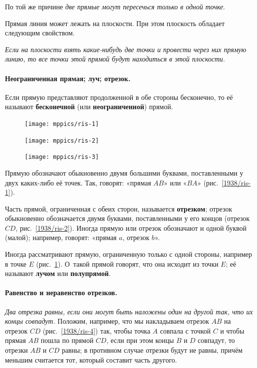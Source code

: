 \documentclass[twoside]{book}
\makeatletter
\newcommand{\rindex}[2][\imki@jobname]{%
  \index[#1]{\detokenize{#2}}%
}
\makeatother
\begin{document}
По той же причине \textit{две прямые могут пересечься только в одной точке}.

Прямая линия может лежать на плоскости.
При этом плоскость обладает следующим свойством.

\textit{Если на плоскости взять какие-нибудь две точки и провести через них прямую линию, то все точки этой прямой будут находиться в этой плоскости.}

\paragraph{Неограниченная прямая; луч; отрезок.}\label{1938/5}
Если прямую представляют продолженной в обе стороны бесконечно, то её называют \textbf{бесконечной} (или \textbf{неограниченной}) прямой.

\begin{figure}
\centering
\texttt{[image: mppics/ris-1]}
\caption{}\label{1938/ris-1}
\bigskip
\texttt{[image: mppics/ris-2]}
\caption{}\label{1938/ris-2}
\bigskip
\texttt{[image: mppics/ris-3]}
\caption{}\label{1938/ris-3}
\end{figure}

Прямую обозначают обыкновенно двумя большими буквами, поставленными у двух каких-либо её точек.
Так, говорят:
«прямая $AB$» или «$BA$» (рис.~\ref{1938/ris-1}).

Часть прямой, ограниченная с обеих сторон, называется \rindex{отрезок}\textbf{отрезком};
отрезок обыкновенно обозначается двумя буквами, поставленными у его концов (отрезок $CD$, рис.~\ref{1938/ris-2}).
Иногда прямую или отрезок обозначают и одной буквой (малой);
например, говорят: «прямая $a$, отрезок $b$».

Иногда рассматривают прямую, ограниченную только с одной стороны, например в точке $E$ (рис.~\ref{1938/ris-3}).
О~такой прямой говорят, что она исходит из точки $E$;
её называют \rindex{луч}\textbf{лучом} или \rindex{полупрямая}\textbf{полупрямой}. 

\paragraph{Равенство и неравенство отрезков.}\label{1938/6}
\emph{Два отрезка равны, если они могут быть наложены один на другой так, что их концы совпадут.}
Положим, например, что мы накладываем отрезок $AB$ на
отрезок $CD$ (рис.~\ref{1938/ris-4}) так, чтобы точка $A$ совпала с точкой $C$ и чтобы прямая $AB$ пошла по прямой $CD$, если при этом концы $B$ и $D$ совпадут, то отрезки $AB$ и $CD$ равны;
в противном случае отрезки будут не равны, причём меньшим считается тот, который составит часть другого.
\end{document}
